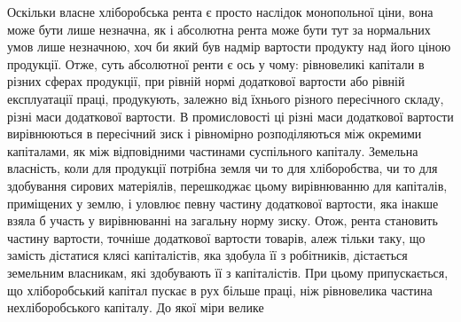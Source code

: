 Оскільки власне хліборобська рента є просто наслідок монопольної ціни,
вона може бути лише незначна, як і абсолютна рента може бути тут за нормальних
умов лише незначною, хоч би який був надмір вартости продукту
над його ціною продукції. Отже, суть абсолютної ренти є ось у чому: рівновеликі
капітали в різних сферах продукції, при рівній нормі додаткової вартости
або рівній експлуатації праці, продукують, залежно від їхнього різного пересічного
складу, різні маси додаткової вартости. В промисловості ці різні маси
додаткової вартости вирівнюються в пересічний зиск і рівномірно розподіляються
між окремими капіталами, як між відповідними частинами суспільного капіталу.
Земельна власність, коли для продукції потрібна земля чи то для хліборобства,
чи то для здобування сирових матеріялів, перешкоджає цьому вирівнюванню для
капіталів, приміщених у землю, і уловлює певну частину додаткової вартости,
яка інакше взяла б участь у вирівнюванні на загальну норму зиску. Отож,
рента становить частину вартости, точніше додаткової вартости товарів, алеж
тільки таку, що замість дістатися клясі капіталістів, яка здобула її з робітників,
дістається земельним власникам, які здобувають її з капіталістів. При
цьому припускається, що хліборобський капітал пускає в рух більше праці,
ніж рівновелика частина нехліборобського капіталу. До якої міри велике
\parbreak{}  %
